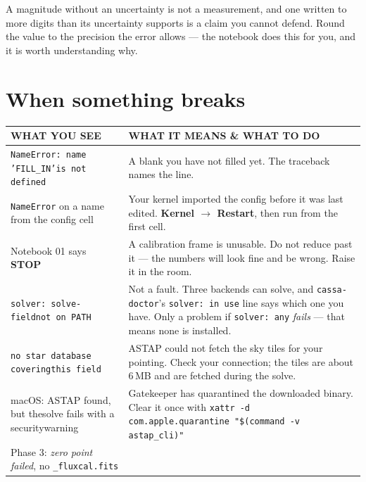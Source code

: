 \documentclass[11pt,a4paper]{article}
\newcommand{\cm}[1]{\texttt{\small #1}}
\newcommand{\thead}[1]{{\sffamily\bfseries\scriptsize\color{inkfaint}\MakeUppercase{#1}}}
\begin{document}
\begin{note}
A magnitude without an uncertainty is not a measurement, and one written to more digits than
its uncertainty supports is a claim you cannot defend. Round the value to the precision the
error allows --- the notebook does this for you, and it is worth understanding why.
\end{note}

\section{When something breaks}
\begin{longtable}{@{}p{5.6cm}p{9.2cm}@{}}
\toprule
\thead{What you see} & \thead{What it means \& what to do} \\
\midrule
\endhead
\cm{NameError: name 'FILL\_IN'\newline is not defined} &
A blank you have not filled yet. The traceback names the line. \\
\cm{NameError} on a name from the config cell &
Your kernel imported the config before it was last edited. \textbf{Kernel $\rightarrow$
Restart}, then run from the first cell. \\
Notebook 01 says \textbf{STOP} &
A calibration frame is unusable. Do not reduce past it --- the numbers will look fine and be
wrong. Raise it in the room. \\
\cm{solver: solve-field}\newline \cm{not on PATH} &
Not a fault. Three backends can solve, and \cm{cassa-doctor}'s \cm{solver: in use} line says
which one you have. Only a problem if \cm{solver: any} \emph{fails} --- that means none is
installed. \\
\cm{no star database covering}\newline \cm{this field} &
ASTAP could not fetch the sky tiles for your pointing. Check your connection; the tiles are
about 6\,MB and are fetched during the solve. \\
macOS: ASTAP found, but the\newline solve fails with a security\newline warning &
Gatekeeper has quarantined the downloaded binary. Clear it once with
\cm{xattr -d com.apple.quarantine "\$(command -v astap\_cli)"} \\
Phase 3: \emph{zero point failed}, no \cm{\_fluxcal.fits} &

\end{longtable}
\end{document}

